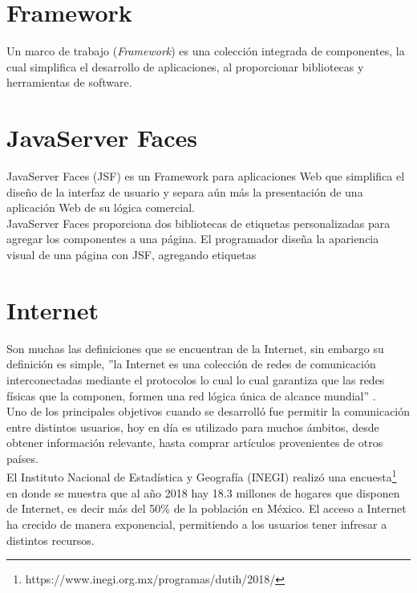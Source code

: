 \section{Framework}
Un marco de trabajo (\textit{Framework}) es una colección integrada de componentes, la cual simplifica el desarrollo de aplicaciones, al proporcionar bibliotecas y herramientas de software.

\section{JavaServer Faces}
JavaServer Faces (JSF) es un Framework para aplicaciones Web que simplifica el diseño de la interfaz de usuario y separa aún más la presentación de una aplicación Web de su lógica comercial.
\\
JavaServer Faces proporciona dos bibliotecas de etiquetas personalizadas para agregar los componentes a una página. El programador diseña la apariencia visual de una página con JSF, agregando etiquetas

\section{Internet}

Son muchas las definiciones que se encuentran de la Internet, sin embargo su definición es simple, 
''la Internet es una colección de redes de comunicación interconectadas mediante el protocolos 
lo cual lo cual garantiza que las redes físicas que la componen, formen una red lógica única de 
alcance mundial'' \citep{CTInternet}.
\\

Uno de los principales objetivos cuando se desarrolló fue permitir la comunicación entre distintos usuarios,
hoy en día es utilizado para muchos ámbitos, desde obtener información relevante, hasta comprar artículos 
provenientes de otros países.
\\

El Instituto Nacional de Estadística y Geografía (INEGI) realizó una encuesta\footnote{https://www.inegi.org.mx/programas/dutih/2018/}  
en donde se muestra que al año 2018 hay 18.3 millones de hogares que disponen de Internet, es decir más del 
50\% de la población en México.
El acceso a Internet ha crecido de manera exponencial, permitiendo a los usuarios tener infresar a distintos recursos.


